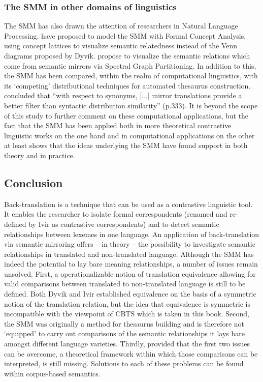 \subsubsection{The SMM in other domains of linguistics}
\label{sec:2.3.4.5}  
The SMM has also drawn the attention of researchers in Natural Language Processing. \citet{ganter_conceptual_2005} have proposed to model the SMM with Formal Concept Analysis, using concept lattices to visualize semantic relatedness instead of the Venn diagrams proposed by Dyvik. \citet{elden_computing_2013} propose to visualize the semantic relations which come from semantic mirrors via Spectral Graph Partitioning. In addition to this, the SMM has been compared, within the realm of computational linguistics, with its ‘competing’ distributional techniques for automated thesaurus construction. \citet{butz_comparing_2011} concluded that “with respect to synonyms, [...] mirror translations provide a better filter than syntactic distribution similarity” (p.333). It is beyond the scope of this study to further comment on these computational applications, but the fact that the SMM has been applied both in more theoretical contrastive linguistic works on the one hand and in computational applications on the other at least shows that the ideas underlying the SMM have found support in both theory and in practice.

\subsection{Conclusion}
\label{sec:2.3.5}  
Back-translation is a technique that can be used as a contrastive linguistic tool. It enables the researcher to isolate formal correspondents (renamed and re-defined by Ivir as contrastive correspondents) and to detect semantic relationships between lexemes in one language. An application of back-translation via semantic mirroring offers – in theory – the possibility to investigate semantic relationships in translated and non-translated language. Although the SMM has indeed the potential to lay bare meaning relationships, a number of issues remain unsolved. First, a operationalizable notion of translation equivalence allowing for valid comparisons between translated to non-translated language is still to be defined. Both Dyvik and Ivir established equivalence on the basis of a symmetric notion of the translation relation, but the idea that equivalence is symmetric is incompatible with the viewpoint of CBTS which is taken in this book. Second, the SMM was originally a method for thesaurus building and is therefore not ‘equipped’ to carry out comparisons of the semantic relationships it lays bare amongst different language varieties. Thirdly, provided that the first two issues can be overcome, a theoretical framework within which those comparisons can be interpreted, is still missing. Solutions to each of these problems can be found within corpus-based semantics.

